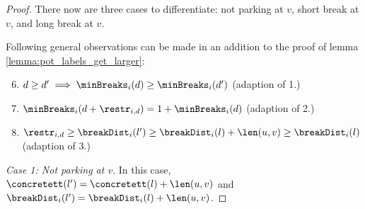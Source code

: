 \begin{proof}
	There now are three cases to differentiate: not parking at $v$, short break at $v$, and long break at $v$.

	Following general observations can be made in an addition to the proof of lemma \ref{lemma:pot_labels_get_larger}:

	\begin{enumerate}
		\setcounter{enumi}{5}
		\item $d \ge d' \implies \minBreaks_i(d) \ge \minBreaks_i(d')$ (adaption of 1.)
		\item $\minBreaks_i(d + \restr_{i,d}) = 1 + \minBreaks_i(d)$ (adaption of 2.)
		\item $\restr_{i,d} \ge \breakDist_i(l') \ge \breakDist_i(l) + \len(u,v) \ge \breakDist_i(l)$ (adaption of 3.)
	\end{enumerate}

	\emph{Case 1: Not parking at $v$}. In this case, $\concretett(l') = \concretett(l) + \len(u,v)$ and $\breakDist_i(l') = \breakDist_i(l) + \len(u,v)$.


\end{proof}
